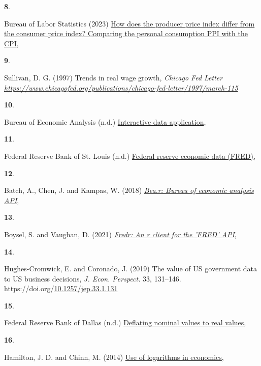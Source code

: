 \documentclass[10pt, letterpaper]{article}
\newlength{\cslhangindent}
\newlength{\csllabelwidth}
\newenvironment{CSLReferences}[2]
  {\begin{list}{}{%
    \setlength{\itemindent}{0pt}
    \setlength{\leftmargin}{0pt}
    \setlength{\parsep}{0pt}
    \ifodd #1
      \setlength{\leftmargin}{\cslhangindent}
      \setlength{\itemindent}{-1\cslhangindent}
    \fi
    \setlength{\itemsep}{#2\baselineskip}}}
  {\end{list}}
\newcommand{\CSLLeftMargin}[1]{\parbox[t]{\csllabelwidth}{\strut#1\strut}}
\newcommand{\CSLRightInline}[1]{\parbox[t]{\linewidth - \csllabelwidth}{\strut#1\strut}}
\begin{document}
\begin{CSLReferences}{1}{0}
\CSLLeftMargin{\textbf{8}. }%
\CSLRightInline{Bureau of Labor Statistics (2023)
\href{https://www.bls.gov/ppi/methodology-reports/comparing-the-producer-price-index-for-personal-consumption-with-the-us-all-items-cpi-for-all-urban-consumers.htm}{How
does the producer price index differ from the consumer price index?
Comparing the personal consumption {PPI} with the {CPI}}, }

\CSLLeftMargin{\textbf{9}. }%
\CSLRightInline{Sullivan, D. G. (1997) Trends in real wage growth,
\emph{Chicago Fed Letter}
\emph{\url{https://www.chicagofed.org/publications/chicago-fed-letter/1997/march-115}}}

\CSLLeftMargin{\textbf{10}. }%
\CSLRightInline{Bureau of Economic Analysis (n.d.)
\href{https://www.bea.gov/itable}{Interactive data application}, }

\CSLLeftMargin{\textbf{11}. }%
\CSLRightInline{Federal Reserve Bank of St. Louis (n.d.)
\href{https://fred.stlouisfed.org/}{Federal reserve economic data
(FRED)}, }

\CSLLeftMargin{\textbf{12}. }%
\CSLRightInline{Batch, A., Chen, J. and Kampas, W. (2018)
\emph{\href{https://CRAN.R-project.org/package=bea.R}{Bea.r: Bureau of
economic analysis API}}, }

\CSLLeftMargin{\textbf{13}. }%
\CSLRightInline{Boysel, S. and Vaughan, D. (2021)
\emph{\href{https://CRAN.R-project.org/package=fredr}{Fredr: An r client
for the 'FRED' API}}, }

\CSLLeftMargin{\textbf{14}. }%
\CSLRightInline{Hughes-Cromwick, E. and Coronado, J. (2019) The value of
{US} government data to {US} business decisions, \emph{J. Econ.
Perspect.} 33, 131--146.
https://doi.org/\href{https://doi.org/10.1257/jep.33.1.131}{10.1257/jep.33.1.131}}

\CSLLeftMargin{\textbf{15}. }%
\CSLRightInline{Federal Reserve Bank of Dallas (n.d.)
\href{https://www.dallasfed.org/research/basics/nominal}{Deflating
nominal values to real values}, }

\CSLLeftMargin{\textbf{16}. }%
\CSLRightInline{Hamilton, J. D. and Chinn, M. (2014)
\href{https://econbrowser.com/archives/2014/02/use-of-logarithms-in-economics}{Use
of logarithms in economics}, }


\end{CSLReferences}
\end{document}

